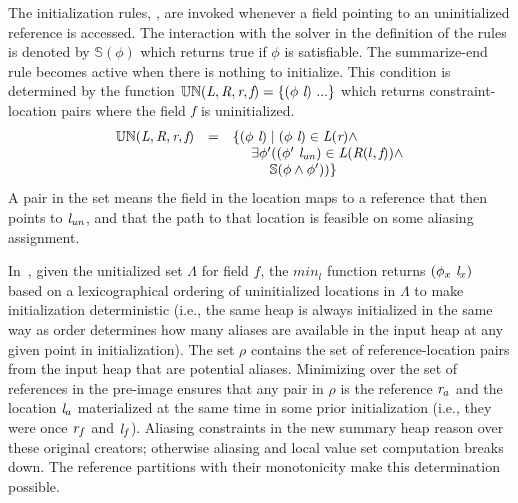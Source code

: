The initialization rules, , are invoked whenever a
field pointing to an uninitialized reference is accessed. The
interaction with the solver in the definition of the rules is denoted
by $\mathbb{S}(\phi)$ which returns true if $\phi$ is satisfiable. The
summarize-end rule becomes active when there is nothing to
initialize. This condition is determined by the function
$\mathbb{UN}(\emph{L}, \emph{R}, \emph{r}, \emph{f}) =
\{(\phi\ \emph{l})\ ...\}$ which returns constraint-location
pairs where the field $\emph{f}$ is uninitialized.
\[
\begin{array}{rcl}
\mathbb{UN}(\cfgnt{L}, \cfgnt{R}, \cfgnt{r}, \cfgnt{f}) & = &\{ \lp\phi\ \cfgnt{l}\rp \mid \lp \phi\ \cfgnt{l}\rp  \in \cfgnt{L}\lp \cfgnt{r}\rp  \wedge \\
& & \ \ \ \ \exists \phi^\prime \lp \lp \phi^\prime\ \cfgnt{l}_\mathit{un}\rp  \in \cfgnt{L}\lp \cfgnt{R}\lp l,\cfgnt{f}\rp\rp \wedge \\
& & \ \ \ \ \ \ \ \ \mathbb{S}\lp \phi \wedge \phi^\prime \rp\rp\}\\
\end{array}
\]
A pair in the set means the field in the location maps to a reference
that then points to $\emph{l}_\mathit{un}$, and that the path to that
location is feasible on some aliasing assignment. 


In~, given the unitialized set $\Lambda$ for
field $f$, the $\mathit{min}_l$ function returns
$(\phi_x\ \cfgnt{l}_x)$ based on a lexicographical ordering of
uninitialized locations in $\Lambda$ to make initialization
deterministic (i.e., the same heap is always initialized in the same
way as order determines how many aliases are available in the input heap at any given point in initialization). 
The set $\rho$ contains the set of
reference-location pairs from the input heap that are potential
aliases. Minimizing over the set of references in the pre-image ensures
that any pair in $\rho$ is the reference $\emph{r}_a$ and the location $\emph{l}_a$ materialized at the same time in some prior initialization (i.e., they were once
$\emph{r}_f$ and $\emph{l}_f$). Aliasing constraints
in the new summary heap reason over these original creators; otherwise aliasing and local value set
computation breaks down.  The reference partitions with their
monotonicity make this determination possible.

